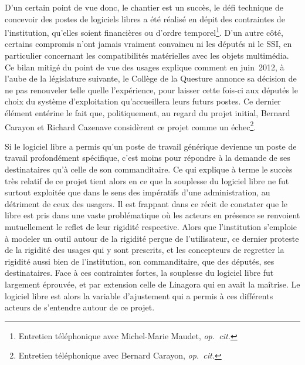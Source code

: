 \documentclass{FramateX}
\begin{document}
\begin{refsection}
D'un certain point de vue donc, le chantier est un succès, le défi
technique de concevoir des postes de logiciels libres a été réalisé en
dépit des contraintes de l'institution, qu'elles soient financières ou
d'ordre temporel\footnote{Entretien téléphonique avec Michel-Marie
Maudet, \textit{op.~cit. }}. D'un autre côté, certains compromis n'ont
jamais vraiment convaincu ni les députés ni le SSI, en particulier
concernant les compatibilités matérielles avec les objets multimédia.
Ce bilan mitigé du point de vue des usages explique comment en
juin~2012, à l'aube de la législature suivante, le Collège de la
Questure annonce sa décision de ne pas renouveler telle quelle
l'expérience, pour laisser cette fois-ci aux députés le choix du
système d'exploitation qu'accueillera leurs futurs postes. Ce dernier
élément entérine le fait que, politiquement, au regard du projet
initial, Bernard Carayon et Richard Cazenave considèrent ce projet
comme un échec\footnote{Entretien téléphonique avec Bernard Carayon,
\textit{op.~cit.}}.

Si le logiciel libre a permis qu'un poste de travail générique devienne
un poste de travail profondément spécifique, c'est moins pour répondre
à la demande de ses destinataires qu'à celle de son commanditaire. Ce
qui explique à terme le succès très relatif de ce projet tient alors en
ce que la souplesse du logiciel libre ne fut surtout exploitée que dans
le sens des impératifs d'une administration, au détriment de ceux des
usagers. Il est frappant dans ce récit de constater que le libre est
pris dans une vaste problématique où les acteurs en présence se
renvoient mutuellement le reflet de leur rigidité respective. Alors que
l'institution s'emploie à modeler un outil autour de la rigidité perçue
de l'utilisateur, ce dernier proteste de la rigidité des usages qui y
sont prescrits, et les concepteurs de regretter la rigidité aussi bien
de l'institution, son commanditaire, que des députés, ses
destinataires. Face à ces contraintes fortes, la souplesse du logiciel
libre fut largement éprouvée, et par extension celle de Linagora qui en
avait la maîtrise. Le logiciel libre est alors la variable d'ajustement
qui a permis à ces différents acteurs de s'entendre autour de ce
projet.


\end{refsection}
\end{document}
